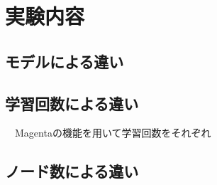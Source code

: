 \chapter{実験内容}
\section{モデルによる違い}

\section{学習回数による違い}

　Magentaの機能を用いて学習回数をそれぞれ
\section{ノード数による違い}

